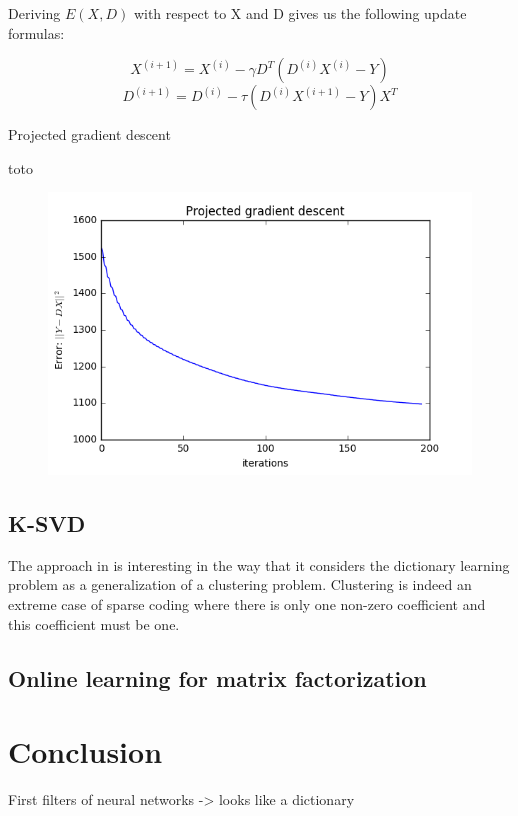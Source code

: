\documentclass[a4paper,11pt]{article}
\begin{document}
Deriving $E(X,D)$ with respect to X and D gives us the following update formulas:

$$ X^{(i+1)} = X^{(i)} - \gamma D^T (D^{(i)}X^{(i)} - Y) $$
$$ D^{(i+1)} = D^{(i)} - \tau (D^{(i)}X^{(i+1)} - Y) X^T $$

\begin{algorithm}
\caption{Projected gradient descent}\label{pgd}
\begin{algorithmic}[1]
\State toto
\end{algorithmic}
\end{algorithm}

\begin{figure}[!htbp]
\centering
  \includegraphics[width=\linewidth]{projected_gradient_descent.png}
\end{figure}

\subsection{K-SVD}
The approach in \cite{aharon06} is interesting in the way that it considers the dictionary learning problem as a generalization of a clustering problem. Clustering is indeed an extreme case of sparse coding where there is only one non-zero coefficient and this coefficient must be one.

\subsection{Online learning for matrix factorization}
\cite{mairal10}

\section{Conclusion}
First filters of neural networks -> looks like a dictionary
\end{document}
